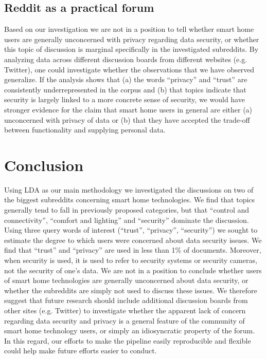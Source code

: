 \documentclass{article}
\begin{document}
    \subsection{Reddit as a practical forum}
    Based on our investigation we are not in a position to tell whether smart home users are generally unconcerned with privacy regarding data security, or whether this topic of discussion is marginal specifically in the investigated subreddits. By analyzing data across different discussion boards from different websites (e.g. Twitter), one could investigate whether the observations that we have observed generalize. If the analysis shows that (a) the words “privacy” and “trust” are consistently underrepresented in the corpus and (b) that topics indicate that security is largely linked to a more concrete sense of security, we would have stronger evidence for the claim that smart home users in general are either (a) unconcerned with privacy of data or (b) that they have accepted the trade-off between functionality and supplying personal data. 
    \section{Conclusion}
    Using LDA as our main methodology we investigated the discussions on two of the biggest subreddits concerning smart home technologies. We find that topics generally tend to fall in previously proposed categories, but that “control and connectivity”, “comfort and lighting” and “security” dominate the discussion. Using three query words of interest (“trust”, “privacy”, “security”) we sought to estimate the degree to which users were concerned about data security issues. We find that “trust” and “privacy” are used in less than 1\% of documents. Moreover, when security is used, it is used to refer to security systems or security cameras, not the security of one’s data. We are not in a position to conclude whether users of smart home technologies are generally unconcerned about data security, or whether the subreddits are simply not used to discuss these issues. We therefore suggest that future research should include additional discussion boards from other sites (e.g. Twitter) to investigate whether the apparent lack of concern regarding data security and privacy is a general feature of the community of smart home technology users, or simply an idiosyncratic property of the forum. In this regard, our efforts to make the pipeline easily reproducible and flexible could help make future efforts easier to conduct. 
\end{document}
